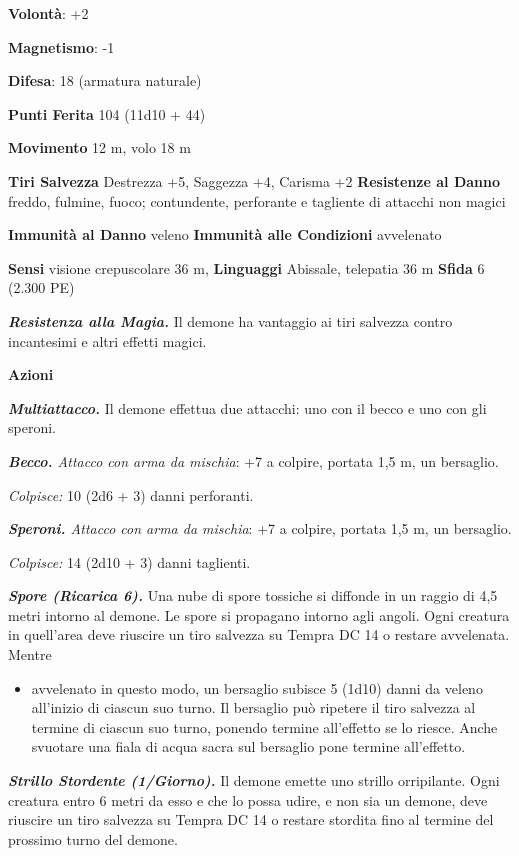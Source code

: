 \begin{multicols}{2}
\textbf{Volontà}: +2

\textbf{Magnetismo}: -1

\textbf{Difesa}: 18 (armatura naturale)

\textbf{Punti Ferita} 104 (11d10 + 44)

\textbf{Movimento} 12 m, volo 18 m

\textbf{Tiri Salvezza} Destrezza +5, Saggezza +4, Carisma +2
\textbf{Resistenze al Danno} freddo, fulmine, fuoco; contundente,
perforante e tagliente di attacchi non magici

\textbf{Immunità al Danno} veleno \textbf{Immunità alle Condizioni}
avvelenato

\textbf{Sensi} visione crepuscolare 36 m, 
\textbf{Linguaggi} Abissale, telepatia 36 m \textbf{Sfida} 6 (2.300 PE)

\emph{\textbf{Resistenza alla Magia.}} Il demone ha vantaggio ai tiri
salvezza contro incantesimi e altri effetti magici.

\textbf{Azioni}

\emph{\textbf{Multiattacco.}} Il demone effettua due attacchi: uno con
il becco e uno con gli speroni.

\emph{\textbf{Becco.} Attacco con arma da mischia}: +7 a colpire,
portata 1,5 m, un bersaglio.

\emph{Colpisce:} 10 (2d6 + 3) danni perforanti.

\emph{\textbf{Speroni.} Attacco con arma da mischia}: +7 a colpire,
portata 1,5 m, un bersaglio.

\emph{Colpisce:} 14 (2d10 + 3) danni taglienti.

\emph{\textbf{Spore (Ricarica 6).}} Una nube di spore tossiche si
diffonde in un raggio di 4,5 metri intorno al demone. Le spore si
propagano intorno agli angoli. Ogni creatura in quell'area deve riuscire
un tiro salvezza su Tempra DC 14 o restare avvelenata. Mentre


\begin{itemize}
\item
  avvelenato in questo modo, un bersaglio subisce 5 (1d10) danni da
  veleno all'inizio di ciascun suo turno. Il bersaglio può ripetere il
  tiro salvezza al termine di ciascun suo turno, ponendo termine
  all'effetto se lo riesce. Anche svuotare una fiala di acqua sacra sul
  bersaglio pone termine all'effetto.
\end{itemize}


\emph{\textbf{Strillo Stordente (1/Giorno).}} Il demone emette uno
strillo orripilante. Ogni creatura entro 6 metri da esso e che lo possa
udire, e non sia un demone, deve riuscire un tiro salvezza su Tempra DC 14 o restare stordita fino al termine del prossimo turno
del demone.



\end{multicols}

